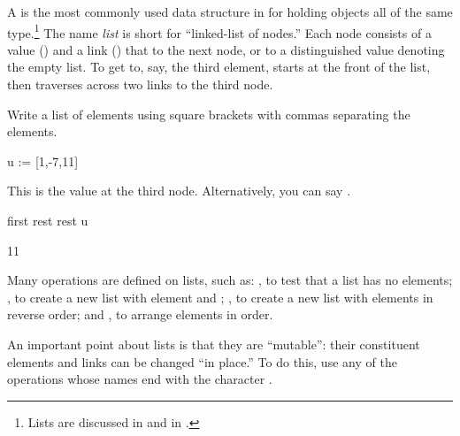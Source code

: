 {{{{{{{{A  is the most commonly used data structure in
\Language{} for holding objects all of the same
type.\footnote{Lists are discussed in  and in
.}
The name {\it list} is short for ``linked-list of nodes.'' Each
node consists of a value () and a link
() that
 to the next node, or to a
distinguished value denoting the empty list.
To get to, say, the third element, \Language{} starts at the front
of the list, then traverses across two links to the third node.

\begin{xtc}
\begin{xtccomment}
Write a list of elements using
square brackets with commas separating the elements.
\end{xtccomment}
\begin{spadsrc}
u := [1,-7,11] 
\end{spadsrc}
\begin{TeXOutput}
\begin{fricasmath}{1}
%
\end{fricasmath}
\end{TeXOutput}
\end{xtc}
\begin{xtc}
\begin{xtccomment}
This is the value at the third node.
Alternatively, you can say .
\end{xtccomment}
\begin{spadsrc}
first rest rest u
\end{spadsrc}
\begin{TeXOutput}
\begin{fricasmath}{2}
11%
\end{fricasmath}
\end{TeXOutput}
\end{xtc}

Many operations are defined on lists, such as:
, to test that a list has no elements;
, to create a new list with
 element  and  ;
, to create a new list with elements in reverse
order; and , to arrange elements in order.

An important point about lists is that they are ``mutable'': their
constituent elements and links can be changed ``in place.''
To do this, use any of the operations whose names end with the
character \spadSyntax{!}.

}}}}}}}}

